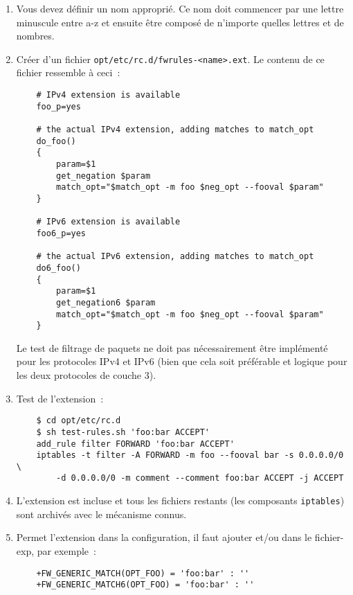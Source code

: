 \begin{enumerate}
\item Vous devez définir un nom approprié. Ce nom doit commencer par une lettre minuscule
entre a-z et ensuite être composé de n'importe quelles lettres et de nombres.


\item Créer d'un fichier \texttt{opt/etc/rc.d/fwrules-<name>.ext}. Le contenu de ce
fichier ressemble à ceci~:

\begin{example}
\begin{verbatim}
    # IPv4 extension is available
    foo_p=yes

    # the actual IPv4 extension, adding matches to match_opt
    do_foo()
    {
        param=$1
        get_negation $param
        match_opt="$match_opt -m foo $neg_opt --fooval $param"
    }

    # IPv6 extension is available
    foo6_p=yes

    # the actual IPv6 extension, adding matches to match_opt
    do6_foo()
    {
        param=$1
        get_negation6 $param
        match_opt="$match_opt -m foo $neg_opt --fooval $param"
    }
\end{verbatim}
\end{example}
Le test de filtrage de paquets ne doit pas nécessairement être implémenté pour
les protocoles IPv4 et IPv6 (bien que cela soit préférable et logique pour les
deux protocoles de couche 3).

\item Test de l'extension~:

\begin{example}
\begin{verbatim}
    $ cd opt/etc/rc.d
    $ sh test-rules.sh 'foo:bar ACCEPT'
    add_rule filter FORWARD 'foo:bar ACCEPT'
    iptables -t filter -A FORWARD -m foo --fooval bar -s 0.0.0.0/0 \
        -d 0.0.0.0/0 -m comment --comment foo:bar ACCEPT -j ACCEPT
\end{verbatim}
\end{example}

\item L’extension est incluse et tous les fichiers restants
  (les composants \texttt{iptables}) sont archivés avec
  le mécanisme connus.
\item Permet l'extension dans la configuration, il faut ajouter
   et/ou  dans le fichier-exp,
  par exemple~:

\begin{example}
\begin{verbatim}
    +FW_GENERIC_MATCH(OPT_FOO) = 'foo:bar' : ''
    +FW_GENERIC_MATCH6(OPT_FOO) = 'foo:bar' : ''
\end{verbatim}
\end{example}
\end{enumerate}
